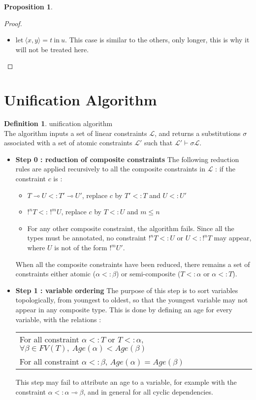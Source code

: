 \documentclass[9pt]{article}
\theoremstyle{plain}
\theoremstyle{definition}
\newtheorem{defn}{Definition}[subsection] %
\newtheorem{prop}{Proposition}[section]
\newcommand{\pair}[2]{\langle #1, #2 \rangle}
\begin{document}
\begin{prop}
\begin{proof}
\begin{itemize}
			\item $\text{let}~ \pair{x}{y} = t ~\text{in}~ u$.
				This case is similar to the others, only longer, this is why it will not be treated here.
		\end{itemize}
	\end{proof}
\end{prop}

\section{Unification Algorithm}

\begin{defn}{unification algorithm} \\
	The algorithm inputs a set of linear constraints $\mathcal{L}$, and returns
	a substitutions $\sigma$ associated with a set of atomic constraints $\mathcal{L'}$ such that
	$\mathcal{L'} \vdash \sigma \mathcal{L}$.
	
  \begin{itemize}
  	\item{\bf Step 0 : reduction of composite constraints} The following reduction rules are applied recursively to all the composite
  		constraints in $\mathcal{L}$ : if the constraint $c$ is :
  		\begin{itemize}
      	\item $T \multimap U <: T' \multimap U'$, replace $c$ by $T' <: T$ and $U <: U'$
      	\item $!^n T <: \, !^m U$, replace $c$ by $T <: U$ and $m \le n$
      	\item For any other composite constraint, the algorithm fails. Since all the types must be annotated, no constraint
      		$!^n T <: U$ or $U <: !^n T$ may appear, where $U$ is not of the form $!^m U'$.
      \end{itemize}
      When all the composite constraints have been reduced, there remains a set of constraints either atomic ($\alpha <: \beta$) or
      semi-composite ($T <: \alpha$ or $\alpha <: T$).  		
  		
  	\item{\bf Step 1 : variable ordering} The purpose of this step is to sort variables topologically, from youngest to oldest,
  	  so that the youngest variable may not appear in any composite type. This is done by defining an age for every variable, with the
  	  relations :
  	  	\begin{center}
  	  	\begin{tabular}{l}
  	  		For all constraint $\alpha <: T$ or $T <: \alpha$, $\forall \beta \in FV(T), ~ Age (\alpha) < Age (\beta)$ \\
  	  		For all constraint $\alpha <: \beta$, $Age (\alpha) = Age (\beta)$
  	  	\end{tabular}
  	  	\end{center}
  	  This step may fail to attribute an age to a variable, for example with the constraint $\alpha <: \alpha \multimap \beta$, and
  	  in general for all cyclic dependencies.
  	  

\end{itemize}
\end{defn}
\end{document}
